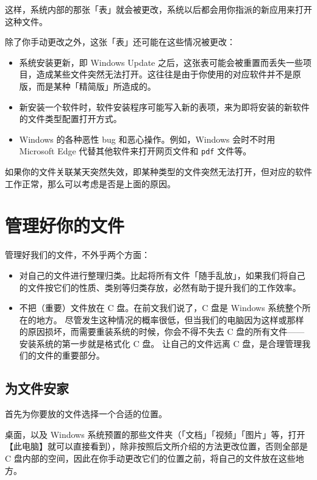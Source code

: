这样，系统内部的那张「表」就会被更改，系统以后都会用你指派的新应用来打开这种文件。

除了你手动更改之外，这张「表」还可能在这些情况被更改：

\begin{itemize}
  \item 系统安装更新，即 Windows Update 之后，这张表可能会被重置而丢失一些项目，造成某些文件突然无法打开。这往往是由于你使用的对应软件并不是原版，而是某种「精简版」所造成的。
  \item 新安装一个软件时，软件安装程序可能写入新的表项，来为即将安装的新软件的文件类型配置打开方式。
  \item Windows 的各种恶性 bug 和恶心操作。例如，Windows 会时不时用 Microsoft Edge 代替其他软件来打开网页文件和 \verb|pdf| 文件等。
\end{itemize}

如果你的文件关联某天突然失效，即某种类型的文件突然无法打开，但对应的软件工作正常，那么可以考虑是否是上面的原因。

\section{管理好你的文件}

管理好我们的文件，不外乎两个方面：

\begin{itemize}
  \item 对自己的文件进行整理归类。比起将所有文件「随手乱放」，如果我们将自己的文件按它们的性质、类别等归类存放，必然有助于提升我们的工作效率。
  \item 不把（重要）文件放在 C 盘。在前文我们说了，C 盘是 Windows 系统整个所在的地方。
    尽管发生这种情况的概率很低，但当我们的电脑因为这样或那样的原因损坏，而需要重装系统的时候，你会不得不失去 C 盘的所有文件——安装系统的第一步就是格式化 C 盘。
    让自己的文件远离 C 盘，是合理管理我们的文件的重要部分。
\end{itemize}

\subsection{为文件安家}

首先为你要放的文件选择一个合适的位置。

桌面，以及 Windows 系统预置的那些文件夹（「文档」「视频」「图片」等，打开【此电脑】就可以直接看到），除非按照后文所介绍的方法更改位置，否则全部是 C 盘内部的空间，因此在你手动更改它们的位置之前，将自己的文件放在这些地方。

